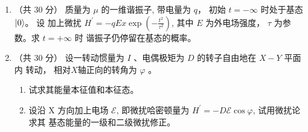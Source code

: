 \begin{enumerate}
{	
}
	
\item 
（共 30 分）
质量为 $\mu$ 的一维谐振子, 带电量为 $q$， 初始 $t=-\infty$ 时处于基态 $ \ket{0}$。 设
加上微扰 $H^{\prime}=-q E x \exp \left(-\frac{t^{2}}{\tau^{2}}\right)$, 其中 $E$ 为外电场强度， $\tau$ 为参数。求 $t=+\infty$ 时 谐振子仍停留在基态的概率。


\item 
（共 30 分）
设一转动惯量为 $I$ 、电偶极矩为 $D$ 的转子自由地在 $X-Y$ 平面内
转动， 相对$ X $轴正向的转角为 $\varphi$ 。
\begin{enumerate}
	\item
试求其能量本征值和本征态。
\item 
设沿 $\mathrm{X}$ 方向加上电场 $ \mathscr{E}$, 即微扰哈密顿量为 $H^{\prime}=-D \mathscr{E} \cos \varphi$,	试用微扰论求其
基态能量的一级和二级微扰修正。
\end{enumerate}
\end{enumerate}
